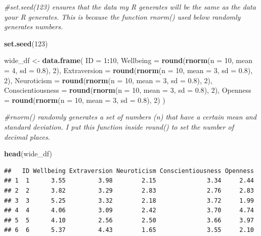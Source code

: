 \documentclass[
]{book}
\newenvironment{Shaded}{\begin{snugshade}}{\end{snugshade}}
\newcommand{\AttributeTok}[1]{\textcolor[rgb]{0.13,0.29,0.53}{#1}}
\newcommand{\CommentTok}[1]{\textcolor[rgb]{0.56,0.35,0.01}{\textit{#1}}}
\newcommand{\DecValTok}[1]{\textcolor[rgb]{0.00,0.00,0.81}{#1}}
\newcommand{\FloatTok}[1]{\textcolor[rgb]{0.00,0.00,0.81}{#1}}
\newcommand{\FunctionTok}[1]{\textcolor[rgb]{0.13,0.29,0.53}{\textbf{#1}}}
\newcommand{\NormalTok}[1]{#1}
\newcommand{\OtherTok}[1]{\textcolor[rgb]{0.56,0.35,0.01}{#1}}
\newcommand{\SpecialCharTok}[1]{\textcolor[rgb]{0.81,0.36,0.00}{\textbf{#1}}}
\begin{document}
\begin{Shaded}
\begin{Highlighting}[]
\CommentTok{\#set.seed(123) ensures that the data my R generates will be the same as the data your R generates. This is because the function rnorm() used below randomly generates numbers. }

\FunctionTok{set.seed}\NormalTok{(}\DecValTok{123}\NormalTok{)}


\NormalTok{wide\_df }\OtherTok{\textless{}{-}} \FunctionTok{data.frame}\NormalTok{(}
  \AttributeTok{ID =} \DecValTok{1}\SpecialCharTok{:}\DecValTok{10}\NormalTok{,}
  \AttributeTok{Wellbeing =} \FunctionTok{round}\NormalTok{(}\FunctionTok{rnorm}\NormalTok{(}\AttributeTok{n =} \DecValTok{10}\NormalTok{, }\AttributeTok{mean =} \DecValTok{4}\NormalTok{, }\AttributeTok{sd =} \FloatTok{0.8}\NormalTok{), }\DecValTok{2}\NormalTok{),}
  \AttributeTok{Extraversion =} \FunctionTok{round}\NormalTok{(}\FunctionTok{rnorm}\NormalTok{(}\AttributeTok{n =} \DecValTok{10}\NormalTok{, }\AttributeTok{mean =} \DecValTok{3}\NormalTok{, }\AttributeTok{sd =} \FloatTok{0.8}\NormalTok{), }\DecValTok{2}\NormalTok{),}
  \AttributeTok{Neuroticism =} \FunctionTok{round}\NormalTok{(}\FunctionTok{rnorm}\NormalTok{(}\AttributeTok{n =} \DecValTok{10}\NormalTok{, }\AttributeTok{mean =} \DecValTok{3}\NormalTok{, }\AttributeTok{sd =} \FloatTok{0.8}\NormalTok{), }\DecValTok{2}\NormalTok{),}
  \AttributeTok{Conscientiousness =} \FunctionTok{round}\NormalTok{(}\FunctionTok{rnorm}\NormalTok{(}\AttributeTok{n =} \DecValTok{10}\NormalTok{, }\AttributeTok{mean =} \DecValTok{3}\NormalTok{, }\AttributeTok{sd =} \FloatTok{0.8}\NormalTok{), }\DecValTok{2}\NormalTok{),}
  \AttributeTok{Openness =} \FunctionTok{round}\NormalTok{(}\FunctionTok{rnorm}\NormalTok{(}\AttributeTok{n =} \DecValTok{10}\NormalTok{, }\AttributeTok{mean =} \DecValTok{3}\NormalTok{, }\AttributeTok{sd =} \FloatTok{0.8}\NormalTok{), }\DecValTok{2}\NormalTok{)}
\NormalTok{)}

\CommentTok{\#rnorm() randomly generates a set of numbers (n) that have a certain mean and standard deviation. I put this function inside round() to set the number of decimal places. }

\FunctionTok{head}\NormalTok{(wide\_df)}
\end{Highlighting}
\end{Shaded}

\begin{verbatim}
##   ID Wellbeing Extraversion Neuroticism Conscientiousness Openness
## 1  1      3.55         3.98        2.15              3.34     2.44
## 2  2      3.82         3.29        2.83              2.76     2.83
## 3  3      5.25         3.32        2.18              3.72     1.99
## 4  4      4.06         3.09        2.42              3.70     4.74
## 5  5      4.10         2.56        2.50              3.66     3.97
## 6  6      5.37         4.43        1.65              3.55     2.10
\end{verbatim}
\end{document}
